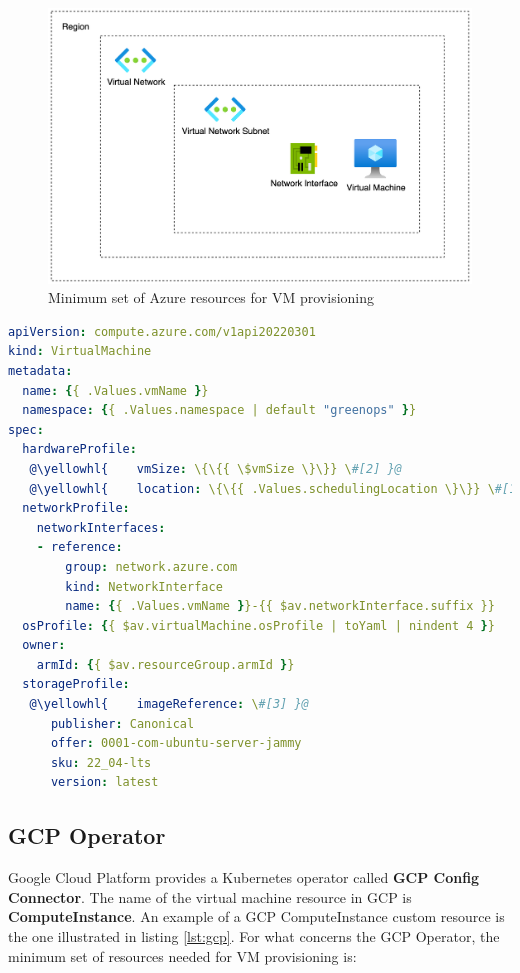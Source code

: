 \begin{figure}[H]
\centering
\includegraphics[width=0.75\linewidth]{images/azure.png}
\caption{Minimum set of Azure resources for VM provisioning}
\label{fig:azure}
\end{figure}

\begin{lstlisting}[language=yaml, caption={Azure Instance Custom Resource}, label={lst:azure}]
apiVersion: compute.azure.com/v1api20220301
kind: VirtualMachine
metadata:
  name: {{ .Values.vmName }}
  namespace: {{ .Values.namespace | default "greenops" }}
spec:
  hardwareProfile:
   @\yellowhl{    vmSize: \{\{{ \$vmSize \}\}} \#[2] }@
   @\yellowhl{    location: \{\{{ .Values.schedulingLocation \}\}} \#[1] }@
  networkProfile:
    networkInterfaces:
    - reference:
        group: network.azure.com
        kind: NetworkInterface
        name: {{ .Values.vmName }}-{{ $av.networkInterface.suffix }}
  osProfile: {{ $av.virtualMachine.osProfile | toYaml | nindent 4 }}
  owner:
    armId: {{ $av.resourceGroup.armId }}
  storageProfile:
   @\yellowhl{    imageReference: \#[3] }@
      publisher: Canonical
      offer: 0001-com-ubuntu-server-jammy
      sku: 22_04-lts
      version: latest
\end{lstlisting}

\subsection{GCP Operator}

Google Cloud Platform provides a Kubernetes operator called \textbf{GCP Config Connector}.
The name of the virtual machine resource in GCP is \textbf{ComputeInstance}.
An example of a GCP ComputeInstance custom resource is the one illustrated in listing \ref{lst:gcp}.
For what concerns the GCP Operator, the minimum set of resources needed for VM provisioning is:

